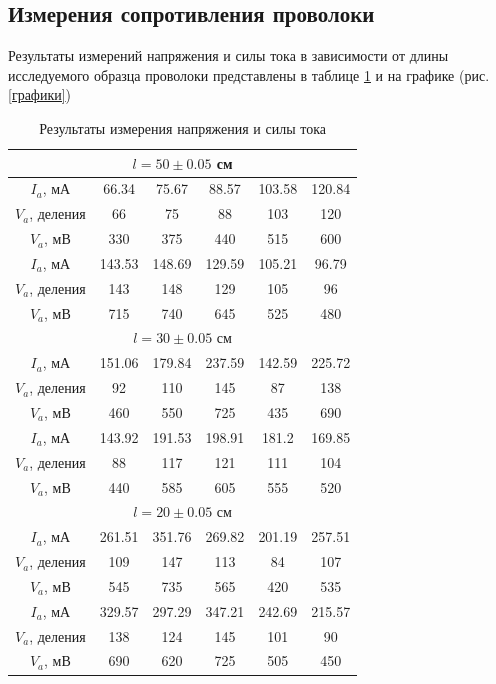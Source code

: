 \documentclass[a4paper,12pt]{article} %
\begin{document}
\subsection{Измерения сопротивления проволоки}
Результаты измерений напряжения и силы тока в зависимости от длины исследуемого образца проволоки представлены в таблице \ref{ампвол} и на графике (рис. \ref{графики})
\begin{table}
\caption{Результаты измерения напряжения и силы тока}
\begin{tabular}{|c|c|c|c|c|c|}
\hline 
   \multicolumn{6}{|c|}{$l = 50 \pm 0.05$ см} \\ 
\hline 
$I_a$, мА & 66.34 & 75.67 & 88.57 & 103.58 & 120.84 \\ 
\hline 
$V_a$, деления & 66 & 75 & 88 & 103 & 120 \\ 
\hline 
$V_a$, мВ & 330 & 375 & 440 & 515 & 600  \\ 
\hline 

$I_a$, мА & 143.53 & 148.69 & 129.59 & 105.21 & 96.79  \\ 
\hline 
$V_a$, деления & 143 & 148 & 129 & 105 & 96 \\ 
\hline 
$V_a$, мВ & 715 & 740 & 645 & 525 & 480 \\ 
\hline 
\hline

   \multicolumn{6}{|c|}{$l = 30 \pm 0.05$ см} \\ 
\hline 
$I_a$, мА &151.06 & 179.84 & 237.59 & 142.59 & 225.72 \\ 
\hline 
$V_a$, деления & 92 & 110 & 145 & 87 & 138 \\ 
\hline 
$V_a$, мВ & 460 & 550 & 725 & 435 & 690 \\ 
\hline 

$I_a$, мА & 143.92 & 191.53 & 198.91 & 181.2 & 169.85  \\ 
\hline 
$V_a$, деления & 88 & 117 & 121 & 111 & 104 \\ 
\hline 
$V_a$, мВ & 440 & 585 & 605 & 555 & 520 \\ 
\hline 
\hline 

   \multicolumn{6}{|c|}{$l = 20 \pm 0.05$ см} \\ 
\hline 
$I_a$, мА & 261.51 & 351.76 & 269.82 & 201.19 & 257.51  \\ 
\hline 
$V_a$, деления & 109 & 147 & 113 & 84 & 107 \\ 
\hline 
$V_a$, мВ & 545 & 735 & 565 & 420 & 535 \\ 
\hline 

$I_a$, мА & 329.57 & 297.29 & 347.21 & 242.69 & 215.57 \\ 
\hline 
$V_a$, деления & 138 & 124 & 145 & 101 & 90 \\ 
\hline 
$V_a$, мВ & 690 & 620 & 725 & 505 & 450  \\ 
\hline 

\end{tabular} 
\label{ампвол}
\end{table}
\end{document}
